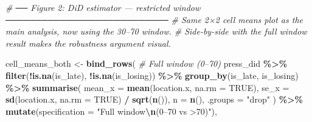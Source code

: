 \documentclass[
]{article}
\newenvironment{Shaded}{\begin{snugshade}}{\end{snugshade}}
\newcommand{\AttributeTok}[1]{\textcolor[rgb]{0.13,0.29,0.53}{#1}}
\newcommand{\CommentTok}[1]{\textcolor[rgb]{0.56,0.35,0.01}{\textit{#1}}}
\newcommand{\ConstantTok}[1]{\textcolor[rgb]{0.56,0.35,0.01}{#1}}
\newcommand{\FunctionTok}[1]{\textcolor[rgb]{0.13,0.29,0.53}{\textbf{#1}}}
\newcommand{\NormalTok}[1]{#1}
\newcommand{\OtherTok}[1]{\textcolor[rgb]{0.56,0.35,0.01}{#1}}
\newcommand{\SpecialCharTok}[1]{\textcolor[rgb]{0.81,0.36,0.00}{\textbf{#1}}}
\newcommand{\StringTok}[1]{\textcolor[rgb]{0.31,0.60,0.02}{#1}}
\begin{document}
\begin{Shaded}
\begin{Highlighting}[]
\CommentTok{\# ── Figure 2: DiD estimator — restricted window ───────────────────────────}
\CommentTok{\# Same 2×2 cell means plot as the main analysis, now using the 30–70 window.}
\CommentTok{\# Side{-}by{-}side with the full window result makes the robustness argument visual.}

\NormalTok{cell\_means\_both }\OtherTok{\textless{}{-}} \FunctionTok{bind\_rows}\NormalTok{(}
  \CommentTok{\# Full window (0–70\textquotesingle{})}
\NormalTok{  press\_did }\SpecialCharTok{\%\textgreater{}\%}
    \FunctionTok{filter}\NormalTok{(}\SpecialCharTok{!}\FunctionTok{is.na}\NormalTok{(is\_late), }\SpecialCharTok{!}\FunctionTok{is.na}\NormalTok{(is\_losing)) }\SpecialCharTok{\%\textgreater{}\%}
    \FunctionTok{group\_by}\NormalTok{(is\_late, is\_losing) }\SpecialCharTok{\%\textgreater{}\%}
    \FunctionTok{summarise}\NormalTok{(}
      \AttributeTok{mean\_x =} \FunctionTok{mean}\NormalTok{(location.x, }\AttributeTok{na.rm =} \ConstantTok{TRUE}\NormalTok{),}
      \AttributeTok{se\_x   =} \FunctionTok{sd}\NormalTok{(location.x,   }\AttributeTok{na.rm =} \ConstantTok{TRUE}\NormalTok{) }\SpecialCharTok{/} \FunctionTok{sqrt}\NormalTok{(}\FunctionTok{n}\NormalTok{()),}
      \AttributeTok{n      =} \FunctionTok{n}\NormalTok{(), }\AttributeTok{.groups =} \StringTok{"drop"}
\NormalTok{    ) }\SpecialCharTok{\%\textgreater{}\%}
    \FunctionTok{mutate}\NormalTok{(}\AttributeTok{specification =} \StringTok{"Full window}\SpecialCharTok{\textbackslash{}n}\StringTok{(0–70\textquotesingle{} vs \textgreater{}70\textquotesingle{})"}\NormalTok{),}


\end{Highlighting}
\end{Shaded}
\end{document}
